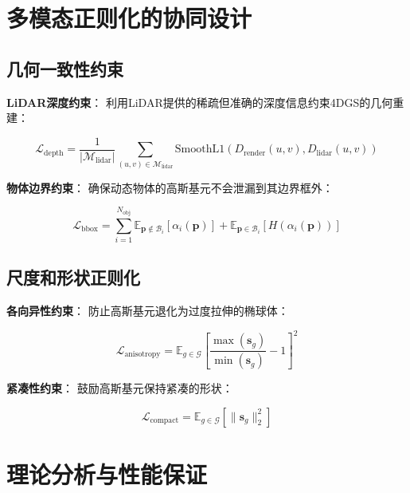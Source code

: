 \section{多模态正则化的协同设计}

\subsection{几何一致性约束}

\textbf{LiDAR深度约束}：
利用LiDAR提供的稀疏但准确的深度信息约束4DGS的几何重建：

\begin{equation}
\mathcal{L}_{\text{depth}} = \frac{1}{|\mathcal{M}_{\text{lidar}}|} \sum_{(u,v) \in \mathcal{M}_{\text{lidar}}} \text{SmoothL1}(D_{\text{render}}(u,v), D_{\text{lidar}}(u,v))
\label{eq:lidar_depth_constraint}
\end{equation}

\textbf{物体边界约束}：
确保动态物体的高斯基元不会泄漏到其边界框外：

\begin{equation}
\mathcal{L}_{\text{bbox}} = \sum_{i=1}^{N_{\text{obj}}} \mathbb{E}_{\mathbf{p} \notin \mathcal{B}_i} [\alpha_i(\mathbf{p})] + \mathbb{E}_{\mathbf{p} \in \mathcal{B}_i} [H(\alpha_i(\mathbf{p}))]
\label{eq:bbox_constraint}
\end{equation}

\subsection{尺度和形状正则化}

\textbf{各向异性约束}：
防止高斯基元退化为过度拉伸的椭球体：

\begin{equation}
\mathcal{L}_{\text{anisotropy}} = \mathbb{E}_{g \in \mathcal{G}} \left[ \frac{\max(\mathbf{s}_g)}{\min(\mathbf{s}_g)} - 1 \right]^2
\label{eq:anisotropy_regularization}
\end{equation}

\textbf{紧凑性约束}：
鼓励高斯基元保持紧凑的形状：

\begin{equation}
\mathcal{L}_{\text{compact}} = \mathbb{E}_{g \in \mathcal{G}} \left[ \|\mathbf{s}_g\|_2^2 \right]
\label{eq:compactness_regularization}
\end{equation}

\section{理论分析与性能保证}

